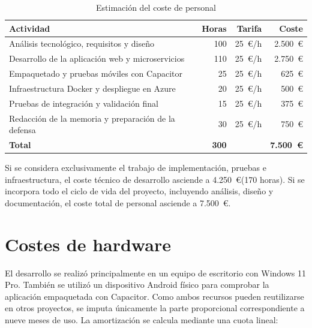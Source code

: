 \begin{table}[H]
    \centering
    \caption{Estimación del coste de personal}
    \label{tab:costes_personal}
    \begin{tabular}{|p{7.2cm}|r|r|r|}
        \hline
        \textbf{Actividad} & \textbf{Horas} & \textbf{Tarifa} & \textbf{Coste} \\
        \hline
        Análisis tecnológico, requisitos y diseño & 100 & 25~\euro/\hspace{0.05em}h & 2.500~\euro \\
        \hline
        Desarrollo de la aplicación web y microservicios & 110 & 25~\euro/\hspace{0.05em}h & 2.750~\euro \\
        \hline
        Empaquetado y pruebas móviles con Capacitor & 25 & 25~\euro/\hspace{0.05em}h & 625~\euro \\
        \hline
        Infraestructura Docker y despliegue en Azure & 20 & 25~\euro/\hspace{0.05em}h & 500~\euro \\
        \hline
        Pruebas de integración y validación final & 15 & 25~\euro/\hspace{0.05em}h & 375~\euro \\
        \hline
        Redacción de la memoria y preparación de la defensa & 30 & 25~\euro/\hspace{0.05em}h & 750~\euro \\
        \hline
        \textbf{Total} & \textbf{300} & & \textbf{7.500~\euro} \\
        \hline
    \end{tabular}
\end{table}

Si se considera exclusivamente el trabajo de implementación, pruebas e infraestructura, el coste técnico de desarrollo asciende a 4.250~\euro (170 horas). Si se incorpora todo el ciclo de vida del proyecto, incluyendo análisis, diseño y documentación, el coste total de personal asciende a 7.500~\euro.

\section{Costes de hardware}
\label{sec:costes_hardware}

El desarrollo se realizó principalmente en un equipo de escritorio con Windows 11 Pro. También se utilizó un dispositivo Android físico para comprobar la aplicación empaquetada con Capacitor. Como ambos recursos pueden reutilizarse en otros proyectos, se imputa únicamente la parte proporcional correspondiente a nueve meses de uso. La amortización se calcula mediante una cuota lineal:

